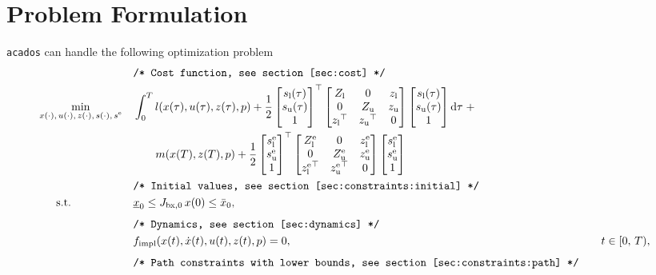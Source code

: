 \documentclass[english]{article}
\newcommand{\acados}{\texttt{acados}}
\newcommand{\tran}{^\top}
\newcommand{\ind}[1]{_{\textrm{#1}}}
\newcommand{\terminal}{^{\textrm{e}}}
\newcommand{\matr}[1]{\begin{bmatrix}#1\end{bmatrix}}
\newcommand{\Lower}{\ind{l}}
\newcommand{\upper}{\ind{u}}
\newcommand{\mathComment}[1]{\texttt{/* #1 */}}
\begin{document}
%
\section{Problem Formulation}\label{sec:problem}
%
\acados{} can handle the following optimization problem
%
\begin{align}
    &&&\mathComment{Cost function, see section \ref{sec:cost}}\nonumber\\
    &\underset{\begin{subarray}{c}
        x(\cdot),\,u(\cdot), \, z(\cdot), \, s(\cdot), \, s\terminal
        \end{subarray}}{\min}
    &&\int_0^T l(x(\tau), u(\tau), z(\tau), p)
     + \frac{1}{2} \matr{s\Lower(\tau) \\ s\upper(\tau) \\ 1} \tran
      \matr{ Z\Lower & 0 & z\Lower \\
      0 & Z\upper & z\upper \\
        {z\Lower}\tran & {z\upper}\tran & 0}
    \matr{s\Lower(\tau) \\ s\upper(\tau) \\ 1} \mathrm{d}\tau \; + \nonumber\\
     &&& \quad \quad m(x(T), z(T), p) +
      \frac{1}{2} \matr{s\Lower\terminal \\ s\upper\terminal \\ 1} \tran
     \matr{ Z\Lower\terminal & 0 & z\Lower\terminal \\
         0 & Z\upper\terminal & z\upper\terminal \\
         {z\Lower\terminal}\tran & {z\upper\terminal}\tran & 0}
     \matr{s\Lower\terminal \\ s\upper\terminal \\ 1}
     \label{eq:cost}\\
    &&&\mathComment{Initial values, see section \ref{sec:constraints:initial}}\nonumber\\
    &\,\,\,\quad \text{s.t.}    &&\underline{x}_0 \leq J_{\textrm{bx},0} \, x(0) \leq \bar{x}_0 , && \label{eq:constraints:initial}\\[1ex]
    &&&\mathComment{Dynamics, see section \ref{sec:dynamics}}\nonumber\\
    &&& f\ind{impl}(x(t), \dot{x}(t), u(t), z(t),p ) = 0, &&\quad t \in [0,\,T), \label{eq:dynamics}\\[1ex]
    &&&\mathComment{Path constraints with lower bounds, see section \ref{sec:constraints:path}}\nonumber\\

\end{align}
\end{document}
